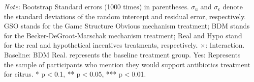 \documentclass[12pt]{article}
\begin{document}
\begin{table}[H]
\begin{tablenotes}
            \footnotesize
            \item \textit{Note:} Bootstrap Standard errors (1000 times) in parentheses.  $\sigma_u$ and $\sigma_e$ denote the standard deviations of the random intercept and residual error, respectively. GSO stands for the Game Structure Obvious mechanism treatment; BDM stands for the Becker-DeGroot-Marschak mechanism treatment; Real and Hypo stand for the real and hypothetical incentives treatments, respectively. $\times$: Interaction. Baseline: BDM Real. represents the baseline treatment group. Yes: Represents the sample of participants who mention they would support antibiotics treatment for citrus. * p$<$0.1, ** p$<$0.05, *** p$<$0.01.
        \end{tablenotes}
\end{table}

\clearpage
\end{document}
